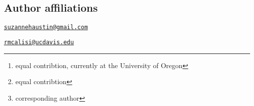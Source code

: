 \hypertarget{author-affiliations}{%
\subsection{Author affiliations}\label{author-affiliations}}


\address{%
Suzanne H. Austin \footnote{equal contribtion, currently at the
  University of Oregon}\\
University of California, Davis\\
\\
}
\href{mailto:suzannehaustin@gmail.com}{\nolinkurl{suzannehaustin@gmail.com}}

\address{%
Rayna M Harris \footnote{equal contribtion}\\
University of California, Davis\\
\\
}


\address{%
Andrew S. Lang\\
University of New Hampshire\\
\\
}


\address{%
Victoria S. Farrar\\
University of California, Davis\\
\\
}


\address{%
April Booth\\
University of California, Davis\\
\\
}


\address{%
Tanner Feustel\\
University of California, Davis\\
\\
}


\address{%
Matthew D. MacManes\\
University of New Hampshire\\
\\
}


\address{%
Rebecca M. Calisi \footnote{corresponding author}\\
University of California, Davis\\
\\
}
\href{mailto:rmcalisi@ucdavis.edu}{\nolinkurl{rmcalisi@ucdavis.edu}}

